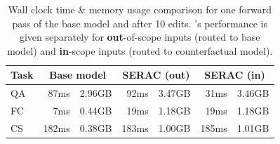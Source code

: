{
\setlength{\tabcolsep}{3pt}
\begin{table}
\small
    \centering
    \begin{tabular}{lrrrrrr}
        \toprule
        Task & \multicolumn{2}{c}{Base model} & \multicolumn{2}{c}{SERAC (\textbf{out})} & \multicolumn{2}{c}{SERAC (\textbf{in})} \\
        \midrule
        QA & 87ms & 2.96GB & 92ms & 3.47GB & 31ms & 3.46GB \\
        \midrule
        FC & 7ms & 0.44GB & 19ms & 1.18GB & 19ms & 1.18GB \\
        \midrule
        CS & 182ms & 0.38GB & 183ms & 1.00GB & 185ms & 1.01GB \\
        \bottomrule
    \end{tabular}
    \caption{Wall clock time \& memory usage comparison for one forward pass of the base model and {\name} after 10 edits. \name's performance is given separately for \textbf{out}-of-scope inputs (routed to base model) and \textbf{in}-scope inputs (routed to counterfactual model).}
    \label{tab:compute-stats}
\end{table}
}